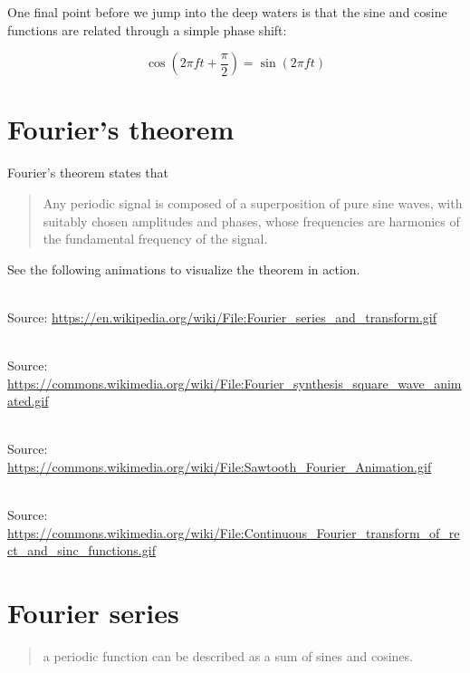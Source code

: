 \documentclass[
  letterpaper,
  DIV=11,
  numbers=noendperiod,
  oneside]{scrreprt}
\begin{document}
One final point before we jump into the deep waters is that the sine and
cosine functions are related through a simple phase shift:

\[
\cos\left(2\pi f t + \frac{\pi}{2}\right) = \sin\left(2\pi f t\right)
\]

\hypertarget{fouriers-theorem}{%
\section{Fourier's theorem}\label{fouriers-theorem}}

Fourier's theorem states that

\begin{quote}
Any periodic signal is composed of a superposition of pure sine waves,
with suitably chosen amplitudes and phases, whose frequencies are
harmonics of the fundamental frequency of the signal.
\end{quote}

See the following animations to visualize the theorem in action.

\strut \\
Source:
\url{https://en.wikipedia.org/wiki/File:Fourier_series_and_transform.gif}

\strut \\
Source:
\url{https://commons.wikimedia.org/wiki/File:Fourier_synthesis_square_wave_animated.gif}

\strut \\
Source:
\url{https://commons.wikimedia.org/wiki/File:Sawtooth_Fourier_Animation.gif}

\strut \\
Source:
\url{https://commons.wikimedia.org/wiki/File:Continuous_Fourier_transform_of_rect_and_sinc_functions.gif}

\hypertarget{fourier-series}{%
\section{Fourier series}\label{fourier-series}}

\begin{quote}
a periodic function can be described as a sum of sines and cosines.
\end{quote}

\end{document}
